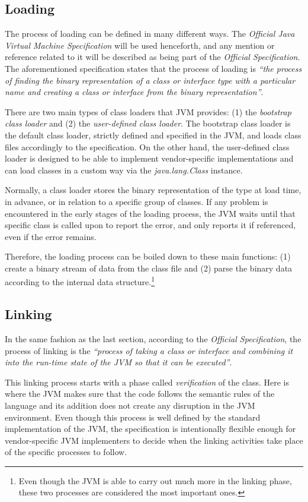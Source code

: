 \documentclass[english,runningheads,a4paper]{llncs}[2018/03/10]
\begin{document}
\subsection*{Loading}
The process of loading can be defined in many different ways. The
\textit{Official Java Virtual Machine Specification} will be used henceforth,
and any mention or reference related to it will be described as being part of
the \textit{Official Specification}. The aforementioned specification states
that the process of loading is \textit{``the process of finding the binary
representation of a class or interface type with a particular name and creating
a class or interface from the binary representation''}.

There are two main types of class loaders that JVM provides: (1) the
\textit{bootstrap class loader} and (2) the \textit{user-defined class loader}.
The bootstrap class loader is the default class loader, strictly defined and
specified in the JVM, and loads class files accordingly to the specification. On
the other hand, the user-defined class loader is designed to be able to
implement vendor-specific implementations and can load classes in a custom way
via the \textit{java.lang.Class} instance.

Normally, a class loader stores the binary representation of the type at load
time, in advance, or in relation to a specific group of classes. If any problem
is encountered in the early stages of the loading process, the JVM waits until
that specific class is called upon to report the error, and only reports it if
referenced, even if the error remains.

Therefore, the loading process can be boiled down to these main functions: (1)
create a binary stream of data from the class file and (2) parse the binary data
according to the internal data structure.\footnote{Even though the JVM is able
to carry out much more in the linking phase, these two processes are considered
the most important ones.}

\subsection*{Linking}
In the same fashion as the last section, according to the \textit{Official
Specification}, the process of linking is the \textit{``process of taking a
class or interface and combining it into the run-time state of the JVM so that
it can be executed''}.

This linking process starts with a phase called \textit{verification} of the
class. Here is where the JVM makes sure that the code follows the semantic rules
of the language and its addition does not create any disruption in the JVM
environment. Even though this process is well defined by the standard
implementation of the JVM, the specification is intentionally flexible enough
for vendor-specific JVM implementers to decide when the linking activities take
place of the specific processes to follow.
\end{document}

